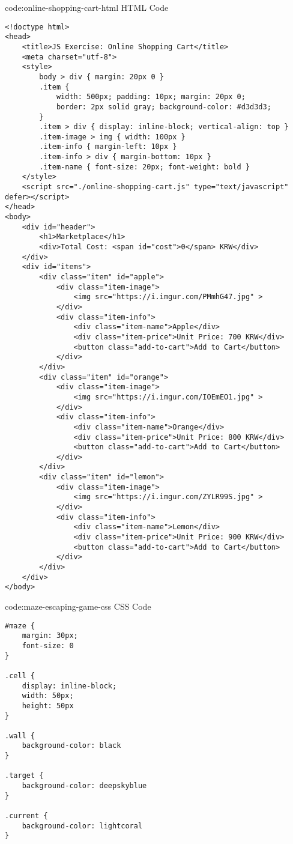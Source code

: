 \begin{codeenv}{code:online-shopping-cart-html}{ HTML Code}
\begin{verbatim}
<!doctype html>
<head>
    <title>JS Exercise: Online Shopping Cart</title>
    <meta charset="utf-8">
    <style>
        body > div { margin: 20px 0 }
        .item {
            width: 500px; padding: 10px; margin: 20px 0;
            border: 2px solid gray; background-color: #d3d3d3;
        }
        .item > div { display: inline-block; vertical-align: top }
        .item-image > img { width: 100px }
        .item-info { margin-left: 10px }
        .item-info > div { margin-bottom: 10px }
        .item-name { font-size: 20px; font-weight: bold }
    </style>
    <script src="./online-shopping-cart.js" type="text/javascript" defer></script>
</head>
<body>
    <div id="header">
        <h1>Marketplace</h1>
        <div>Total Cost: <span id="cost">0</span> KRW</div>
    </div>
    <div id="items">
        <div class="item" id="apple">
            <div class="item-image">
                <img src="https://i.imgur.com/PMmhG47.jpg" >
            </div>
            <div class="item-info">
                <div class="item-name">Apple</div>
                <div class="item-price">Unit Price: 700 KRW</div>
                <button class="add-to-cart">Add to Cart</button>
            </div>
        </div>
        <div class="item" id="orange">
            <div class="item-image">
                <img src="https://i.imgur.com/IOEmEO1.jpg" >
            </div>
            <div class="item-info">
                <div class="item-name">Orange</div>
                <div class="item-price">Unit Price: 800 KRW</div>
                <button class="add-to-cart">Add to Cart</button>
            </div>
        </div>
        <div class="item" id="lemon">
            <div class="item-image">
                <img src="https://i.imgur.com/ZYLR99S.jpg" >
            </div>
            <div class="item-info">
                <div class="item-name">Lemon</div>
                <div class="item-price">Unit Price: 900 KRW</div>
                <button class="add-to-cart">Add to Cart</button>
            </div>
        </div>
    </div>
</body>
\end{verbatim}
\end{codeenv}

\begin{codeenv}{code:maze-escaping-game-css}{ CSS Code}
\begin{verbatim}
#maze {
    margin: 30px;
    font-size: 0
}

.cell {
    display: inline-block;
    width: 50px;
    height: 50px
}

.wall {
    background-color: black
}

.target {
    background-color: deepskyblue
}

.current {
    background-color: lightcoral
}
\end{verbatim}
\end{codeenv}

